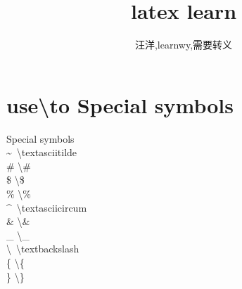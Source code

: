\documentclass{article}
\author{汪洋,learnwy,需要转义}
\title{latex learn}
\date{}
\begin{document}
\maketitle
\tableofcontents
\newpage

\section{use\textbackslash to Special symbols}

Special symbols\\
\textasciitilde\ \textbackslash textasciitilde\\
\# \textbackslash\#\\
\$ \textbackslash\$\\
\% \textbackslash\%\\
\textasciicircum\ \textbackslash textasciicircum\\
\& \textbackslash\&\\
\_ \textbackslash\_\\
\textbackslash\ \textbackslash textbackslash\\
\{ \textbackslash\{\\
\} \textbackslash\}
\end{document}
